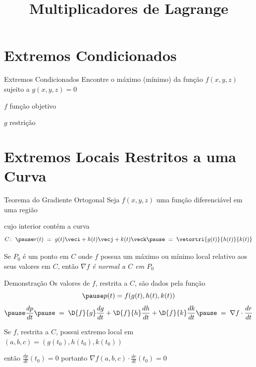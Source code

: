 \documentclass[fleqn,utf8,aspectratio=169,12pt,ignorenonframetext]{beamer}
\title{Multiplicadores de Lagrange}
\begin{document}
\addtitle

\section{Extremos Condicionados}

\begin{frame}{Extremos Condicionados}
  Encontre o máximo (mínimo) da função \(f(x, y, z)\)\\[2mm]
  sujeito a \(g(x, y, z) = 0\)

  \pause
  \vspace{\baselineskip}
  \quad \emph{$f$} \quad função objetivo

  \pause
  \quad \emph{$g$} \quad restrição
\end{frame}


\section{Extremos Locais Restritos a uma Curva}

\begin{frame}{Teorema do Gradiente Ortogonal}
  Seja \(f(x, y, z)\) uma função diferenciável em uma região

  \pause
  cujo interior contém a curva
  \[
    C\colon\;
    \pause r(t) \;=\; g(t)\veci + h(t)\vecj + k(t)\veck
    \pause \;=\; \vetortri{g(t)}{h(t)}{k(t)}
  \]

  \pause
  Se $P_0$ é um ponto em $C$ onde $f$ possua um máximo ou mínimo local relativo
  aos seus valores em $C$,
  \pause
  então \emph{\(\nabla f\) é normal a $C$ em $P_0$}
\end{frame}

\begin{proofframe}{Demonstração}
  Os valores de $f$, restrita a $C$, são dados pela função
  \[
    \pause
    p(t) = f(g(t), h(t), k(t))
  \]
  \[
    \pause
    \frac{dp}{dt}
    \pause
    \;=\; \D{f}{g}\frac{dg}{dt}
    + \D{f}{h}\frac{dh}{dt}
    + \D{f}{k}\frac{dk}{dt}
    \pause
    \;=\; \nabla f \cdot \frac{dr}{dt}
  \]

  \pause
  Se $f$, restrita a $C$, possui extremo local em \((a, b, c) = (g(t_0), h(t_0), k(t_0))\)

  \pause
  \vspace{0.4\baselineskip}
  então \(\frac{dp}{dt}(t_0)=0\)
  \pause
  \qquad
  portanto
  \quad
  \emph{\(
    \nabla f(a, b, c) \cdot \frac{dr}{dt}(t_0) = 0
  \)}
\end{proofframe}
\end{document}
